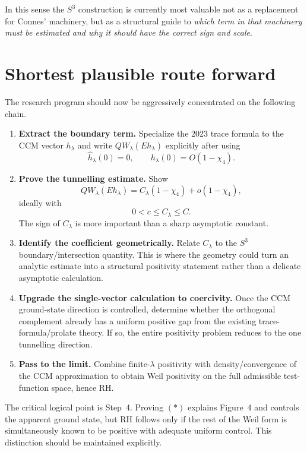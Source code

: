 \documentclass[11pt]{article}
\begin{document}
In this sense the \(S^3\) construction is currently most valuable not
as a replacement for Connes' machinery, but as a structural guide to
\emph{which term in that machinery must be estimated and why it should
have the correct sign and scale}.

\section{Shortest plausible route forward}

The research program should now be aggressively concentrated on the
following chain.

\begin{enumerate}[leftmargin=2em]
\item \textbf{Extract the boundary term.}
Specialize the 2023 trace formula to the CCM vector \(h_\lambda\) and
write \(QW_\lambda(Eh_\lambda)\) explicitly after using
\[
        \widehat h_\lambda(0)=0,
        \qquad
        h_\lambda(0)=O(1-\chi_4).
\]

\item \textbf{Prove the tunnelling estimate.}
Show
\[
        QW_\lambda(Eh_\lambda)
        =
        C_\lambda(1-\chi_4)
        +o(1-\chi_4),
\]
ideally with
\[
        0<c\leq C_\lambda\leq C.
\]
The sign of \(C_\lambda\) is more important than a sharp asymptotic
constant.

\item \textbf{Identify the coefficient geometrically.}
Relate \(C_\lambda\) to the \(S^3\) boundary/intersection quantity.
This is where the geometry could turn an analytic estimate into a
structural positivity statement rather than a delicate asymptotic
calculation.

\item \textbf{Upgrade the single-vector calculation to coercivity.}
Once the CCM ground-state direction is controlled, determine whether
the orthogonal complement already has a uniform positive gap from the
existing trace-formula/prolate theory.  If so, the entire positivity
problem reduces to the one tunnelling direction.

\item \textbf{Pass to the limit.}
Combine finite-\(\lambda\) positivity with density/convergence of the
CCM approximation to obtain Weil positivity on the full admissible
test-function space, hence RH.
\end{enumerate}

The critical logical point is Step~4.  Proving \((*)\) explains
Figure~4 and controls the apparent ground state, but RH follows only
if the rest of the Weil form is simultaneously known to be positive
with adequate uniform control.  This distinction should be maintained
explicitly.
\end{document}
